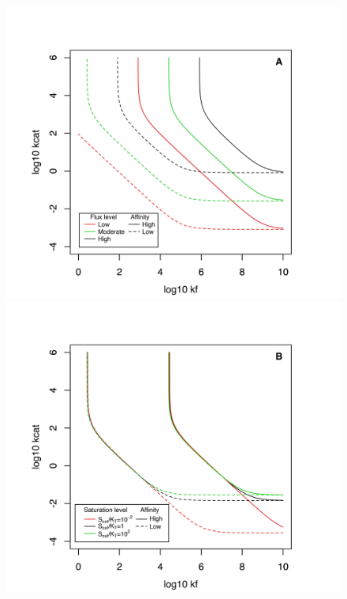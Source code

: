 \documentclass[nogrid,crop,final]{MBE2}%
\begin{document}
\begin{figure}[h!]
\centering
\includegraphics[scale=0.6,trim=0.5cm -0.3cm 0cm 1.5cm,clip]{Figures/2DFit_Flux_Sat.jpeg}
\includegraphics[scale=0.6,trim=0.5cm -0.3cm 0cm 1.5cm,clip]{Figures/2DFit_NonSatToSat.jpeg}

\end{figure}
\end{document}
